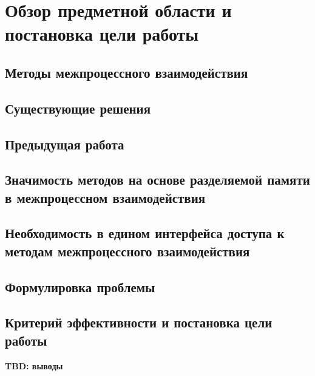 \chapter{Обзор предметной области и постановка цели работы}

\startrelatedwork

\section{Методы межпроцессного взаимодействия}

\section{Существующие решения}

\section{Предыдущая работа}

\section{Значимость методов на основе разделяемой памяти в межпроцессном взаимодействия}

\section{Необходимость в едином интерфейса доступа к методам межпроцессного взаимодействия}

\finishrelatedwork

\section{Формулировка проблемы}

\section{Критерий эффективности и постановка цели работы}


\chapterconclusion

\textbf{TBD: выводы}